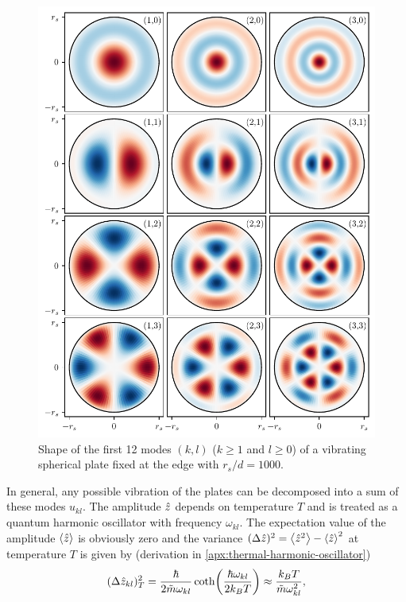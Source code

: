 \begin{figure}[!htbp]
  \centering
  \includegraphics[width=\textwidth]{./../figures/vibrations/vibrational-modes-rd_bu.pdf}
  \caption{Shape of the first 12 modes $(k,l)$ ($k \geq 1$ and $l \geq 0$) of a vibrating spherical plate fixed at the edge with $r_s/d = 1000$.}
  \label{fig:5:vibrational-modes}
\end{figure}
In general, any possible vibration of the plates can be decomposed into a sum of these modes $u_{kl}$.
The amplitude $\hat{z}$ depends on temperature $T$ and is treated as a quantum harmonic oscillator with frequency $\omega_{kl}$.
The expectation value of the amplitude $\left\langle\hat{z}\right\rangle$ is obviously zero and the variance $(\Delta \hat{z})^2 = \left\langle\hat{z}^2\right\rangle - \left\langle\hat{z}\right\rangle^2$ at temperature $T$ is given by (derivation in \cref{apx:thermal-harmonic-oscillator})
\begin{equation}\label{eq:5:amplitude-variance}
  (\Delta \hat{z}_{kl})^2_T = \frac{\hbar}{2\tilde{m}\omega_{kl}}\coth(\frac{\hbar \omega_{kl}}{2k_BT}) \approx \frac{k_B T}{\tilde{m}\omega_{kl}^2} ,
\end{equation}
